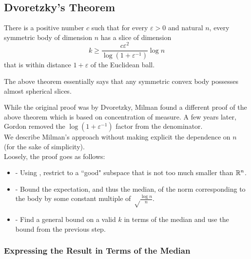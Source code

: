 \subsection{Dvoretzky's Theorem}

\begin{ftheo}
\label{dvoretzkys theorem}
There is a positive number $c$ such that for every $\varepsilon>0$ and natural $n$, every symmetric body of dimension $n$ has a slice of dimension
\[ k \geq \frac{c\varepsilon^2}{\log(1+\varepsilon^{-1})} \log n \]
that is within distance $1+\varepsilon$ of the Euclidean ball.
\end{ftheo}

The above theorem essentially says that any symmetric convex body possesses almost spherical slices.

While the original proof was by Dvoretzky, Milman found a different proof of the above theorem which is based on concentration of measure. A few years later, Gordon removed the $\log(1+\varepsilon^{-1})$ factor from the denominator.\\
We describe Milman's approach without making explicit the dependence on $n$ (for the sake of simplicity).\\

Loosely, the proof goes as follows:
\begin{itemize}
    \item {} - Using , restrict to a ``good" subspace that is not too much smaller than $\mathbb{R}^n$.
    \item {} - Bound the expectation, and thus the median, of the norm corresponding to the body by some constant multiple of $\sqrt\frac{\log n}{n}$.
    \item {} - Find a general bound on a valid $k$ in terms of the median and use the bound from the previous step. 
\end{itemize}

\subsubsection{Expressing the Result in Terms of the Median}
\label{median bound}

